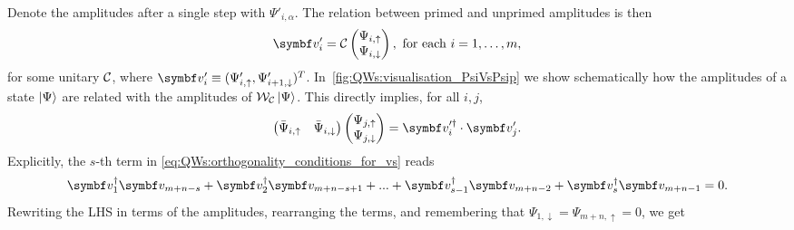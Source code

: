 Denote the amplitudes after a single step with $\Psi'_{i,\alpha}$.
The relation between primed and unprimed amplitudes is then
\begin{equation}
	\bs v_i^\prime
	= \mathcal C
	\begin{pmatrix}
		\Psi_{i,\uparrow} \\ \Psi_{i, \downarrow}
	\end{pmatrix},
	\text{ for each }
	i = 1, \dots, m,
\end{equation}
for some unitary ${\mathcal{C}}$,
where $\bs v'_i \equiv (\Psi_{i,\uparrow}',\Psi_{i+1,\downarrow}')^T$.
In~\cref{fig:QWs:visualisation_PsiVsPsip} we show schematically how the amplitudes of a state $\ket\Psi$ are related with the amplitudes of ${\mathcal{W}}_{\mathcal{C}}\ket\Psi$.
This directly implies, for all $i, j$,
\begin{equation}
	\begin{pmatrix}
		\bar\Psi_{i, \uparrow} & \bar\Psi_{i, \downarrow}
	\end{pmatrix}
	\begin{pmatrix}
		\Psi_{j, \uparrow} \\ \Psi_{j, \downarrow}
	\end{pmatrix}
	=
	\bs v^{\prime\dagger}_{i} \cdot \bs v^\prime_j.
    \label{eq:QWs:transition_us_to_vprimes}
\end{equation}
Explicitly, the $s$-th term in \cref{eq:QWs:orthogonality_conditions_for_vs} reads
\begin{equation}
	\bs v_1^\dagger \bs v_{m+n-s}
	+ \bs v_2^\dagger \bs v_{m+n-s+1}
	+ ...
	+ \bs v_{s-1}^\dagger \bs v_{m+n-2}
    + \bs v_s^\dagger \bs v_{m+n-1} = 0.
\end{equation}
Rewriting the LHS in terms of the amplitudes, rearranging the terms, and remembering that $\Psi_{1, \downarrow} = \Psi_{m+n, \uparrow} = 0$, we get
